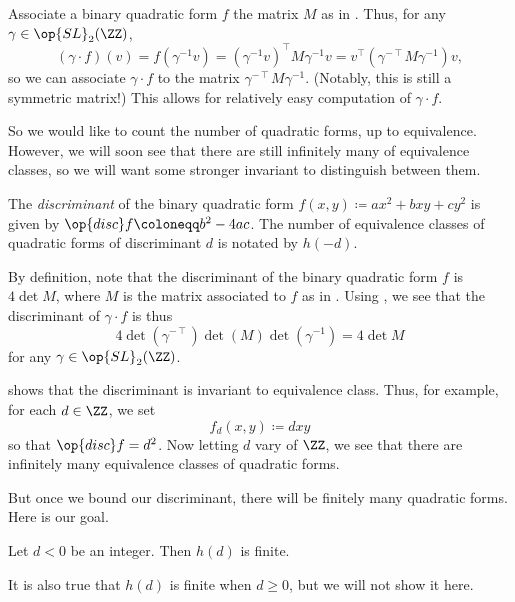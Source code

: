 \documentclass[../notes.tex]{subfiles}
\begin{document}
\begin{remark} \label{rem:matrix-of-equiv-form}
	Associate a binary quadratic form $f$ the matrix $M$ as in . Thus, for any $\gamma\in\op{SL}_2(\ZZ)$,
	\[(\gamma\cdot f)(v)=f\left(\gamma^{-1}v\right)=\left(\gamma^{-1}v\right)^\intercal M\gamma^{-1}v=v^\intercal\left(\gamma^{-\intercal}M\gamma^{-1}\right)v,\]
	so we can associate $\gamma\cdot f$ to the matrix $\gamma^{-\intercal}M\gamma^{-1}$. (Notably, this is still a symmetric matrix!) This allows for relatively easy computation of $\gamma\cdot f$.
\end{remark}
So we would like to count the number of quadratic forms, up to equivalence. However, we will soon see that there are still infinitely many of equivalence classes, so we will want some stronger invariant to distinguish between them.
\begin{definition}[discriminant]
	The \textit{discriminant} of the binary quadratic form $f(x,y)\coloneqq ax^2+bxy+cy^2$ is given by $\op{disc}f\coloneqq b^2-4ac$. The number of equivalence classes of quadratic forms of discriminant $d$ is notated by $h(-d)$.
\end{definition}
\begin{remark} \label{rem:disc-on-equiv-class}
	By definition, note that the discriminant of the binary quadratic form $f$ is $4\det M$, where $M$ is the matrix associated to $f$ as in . Using , we see that the discriminant of $\gamma\cdot f$ is thus
	\[4\det\left(\gamma^{-\intercal}\right)\det(M)\det\left(\gamma^{-1}\right)=4\det M\]
	for any $\gamma\in\op{SL}_2(\ZZ)$.
\end{remark}
 shows that the discriminant is invariant to equivalence class. Thus, for example, for each $d\in\ZZ$, we set
\[f_d(x,y)\coloneqq dxy\]
so that $\op{disc}f=d^2$. Now letting $d$ vary of $\ZZ$, we see that there are infinitely many equivalence classes of quadratic forms.

But once we bound our discriminant, there will be finitely many quadratic forms. Here is our goal.
\begin{theorem} \label{thm:class-number-finite}
	Let $d<0$ be an integer. Then $h(d)$ is finite.
\end{theorem}
\begin{remark}
	It is also true that $h(d)$ is finite when $d\ge0$, but we will not show it here.
\end{remark}
\end{document}
